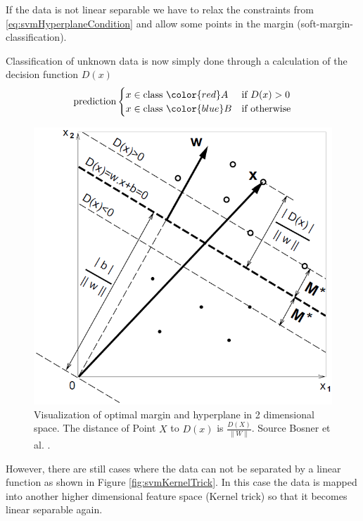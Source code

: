 If the data is not linear separable we have to relax the constraints from \ref{eq:svmHyperplaneCondition} and allow some points in the margin {(soft-margin-classification)}. 

Classification of unknown data is now simply done through a calculation of the decision function $D(x)$
\begin{equation}
\text{prediction}
	\begin{cases}
	x \in \text{class } {\color{red}A} & \text{if } D(x) > 0 \\
	x \in \text{class } {\color{blue}B} & \text{if } \text{otherwise}
	\end{cases}	
\end{equation}

\begin{figure}[ht]
	\centering
	\includegraphics[scale=0.4]{figures/theorySVM_distanceToW}
	\caption{Visualization of optimal margin and hyperplane in 2 dimensional space. The distance of Point $X$ to $D(x)$ is $\frac{D(X)}{\|W\|}$. Source Bosner et al. \cite{Boser1992}.}
	\label{fig:svmHyperplaneDistance}
\end{figure}

However, there are still cases where the data can not be separated by a linear function as shown in Figure \ref{fig:svmKernelTrick}. In this case the data is mapped into another higher dimensional feature space {(Kernel trick)} so that it becomes linear separable again.

